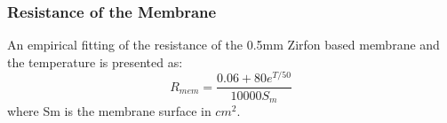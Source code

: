 


\subsubsection{Resistance of the Membrane}
An empirical fitting of the resistance of the 0.5mm Zirfon based membrane and the temperature is presented as:\cite{activation4}
\begin{equation}
R_{mem} = \frac{0.06+80e^{T/50}}{10000S_m}
\end{equation}
where Sm is the membrane surface in $cm^2$.

